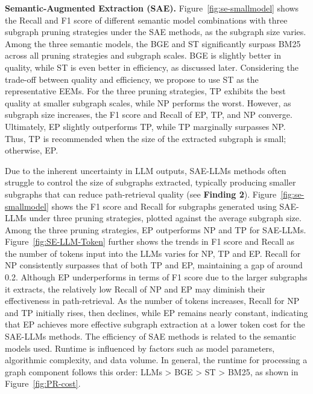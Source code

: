 {\bf Semantic-Augmented Extraction (SAE).}
Figure~\ref{fig:se-smallmodel} shows the Recall and F1 score of different semantic model combinations with three subgraph pruning strategies  under the SAE methods, as the subgraph size varies. %
Among the three semantic models, the BGE and ST significantly surpass BM25 across all pruning strategies and subgraph scales. BGE is slightly better in quality, while ST is even better in efficiency,  as discussed later. 
Considering the trade-off between quality and efficiency, we propose to use ST as the representative EEMs.
For the three pruning strategies, TP exhibits the best quality at smaller subgraph scales, while NP performs the worst. However, as subgraph size increases, the F1 score and Recall of EP, TP, and NP converge. Ultimately, EP slightly outperforms TP, while TP marginally surpasses NP.
Thus, TP is recommended when the size of the extracted subgraph is small; otherwise, EP.


Due to the inherent uncertainty in LLM outputs, SAE-LLMs methods often struggle to control the size of subgraphs extracted, typically producing smaller subgraphs that can reduce path-retrieval quality (see \textbf{Finding 2}).  
Figure~\ref{fig:se-smallmodel} shows the F1 score and Recall for subgraphs generated using SAE-LLMs under three pruning strategies, plotted against the average subgraph size. 
Among the three pruning strategies, EP outperforms NP and TP for SAE-LLMs.
Figure~\ref{fig:SE-LLM-Token} further shows the trends in F1 score and Recall as the number of tokens input into the LLMs varies for NP, TP and EP. Recall for NP consistently surpasses that of both TP and EP, maintaining a gap of around 0.2. Although EP underperforms in terms of F1 score due to the larger subgraphs it extracts, the relatively low Recall of NP and EP may diminish their effectiveness in path-retrieval. As the number of tokens increases, Recall for NP and TP initially rises, then declines, while EP remains nearly constant, indicating that EP achieves more effective subgraph extraction at a lower token cost for the SAE-LLMs methods.
The efficiency of SAE methods is related to the semantic models used. Runtime is influenced by factors such as model parameters, algorithmic complexity, and data volume. In general, the runtime for processing a graph component follows this order: LLMs > BGE > ST > BM25, as shown in Figure~\ref{fig:PR-cost}.




